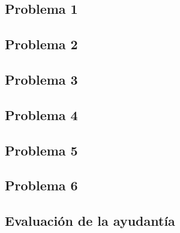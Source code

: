 \documentclass[letterpaper]{article}
\begin{document}


\subsection*{Problema 1}


\subsection*{Problema 2}


\subsection*{Problema 3}


\subsection*{Problema 4}


\subsection*{Problema 5}


\subsection*{Problema 6}


\newpage

\subsection*{Evaluación de la ayudantía}

\end{document}
